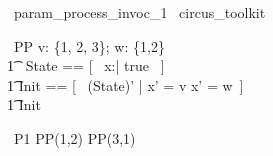 
\begin{zsection}
  \SECTION\ param\_process\_invoc\_1 \parents\ circus\_toolkit
\end{zsection}

\begin{circus}
    \circprocess\ PP \circdef  v: \{1, 2, 3\}; w: \{1,2\} \circspot \circbegin  \\
    	\t1 \circstate\ State == [~ x:\nat | true ~] \\
    	\t1	Init == [~ (State)' | x' = v \lor x' = w~] \\
        \t1 \circspot \lschexpract Init \rschexpract \circseq \Skip \\
    \circend
\end{circus}

\begin{circus}
    \circprocess\ P1 \circdef PP(1,2) \interleave PP(3,1) \\
\end{circus}
